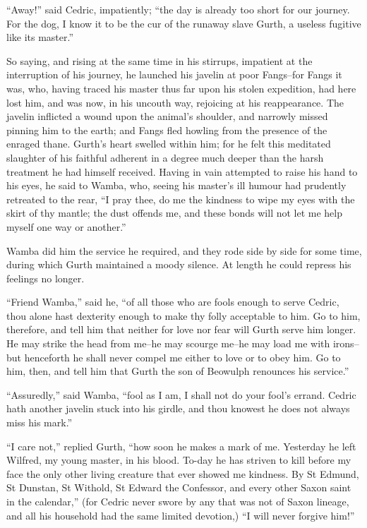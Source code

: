 ``Away!'' said Cedric, impatiently; ``the day is already too short for
our journey. For the dog, I know it to be the cur of the runaway slave
Gurth, a useless fugitive like its master.''

So saying, and rising at the same time in his stirrups, impatient at the
interruption of his journey, he launched his javelin at poor Fangs--for
Fangs it was, who, having traced his master thus far upon his stolen
expedition, had here lost him, and was now, in his uncouth way,
rejoicing at his reappearance. The javelin inflicted a wound upon the
animal's shoulder, and narrowly missed pinning him to the earth; and
Fangs fled howling from the presence of the enraged thane. Gurth's heart
swelled within him; for he felt this meditated slaughter of his faithful
adherent in a degree much deeper than the harsh treatment he had himself
received. Having in vain attempted to raise his hand to his eyes, he
said to Wamba, who, seeing his master's ill humour had prudently
retreated to the rear, ``I pray thee, do me the kindness to wipe my eyes
with the skirt of thy mantle; the dust offends me, and these bonds will
not let me help myself one way or another.''

Wamba did him the service he required, and they rode side by side for
some time, during which Gurth maintained a moody silence. At length he
could repress his feelings no longer.

``Friend Wamba,'' said he, ``of all those who are fools enough to serve
Cedric, thou alone hast dexterity enough to make thy folly acceptable to
him. Go to him, therefore, and tell him that neither for love nor fear
will Gurth serve him longer. He may strike the head from me--he may
scourge me--he may load me with irons--but henceforth he shall never
compel me either to love or to obey him. Go to him, then, and tell him
that Gurth the son of Beowulph renounces his service.''

``Assuredly,'' said Wamba, ``fool as I am, I shall not do your fool's
errand. Cedric hath another javelin stuck into his girdle, and thou
knowest he does not always miss his mark.''

``I care not,'' replied Gurth, ``how soon he makes a mark of me.
Yesterday he left Wilfred, my young master, in his blood. To-day he has
striven to kill before my face the only other living creature that ever
showed me kindness. By St Edmund, St Dunstan, St Withold, St Edward the
Confessor, and every other Saxon saint in the calendar,'' (for Cedric
never swore by any that was not of Saxon lineage, and all his household
had the same limited devotion,) ``I will never forgive him!''


